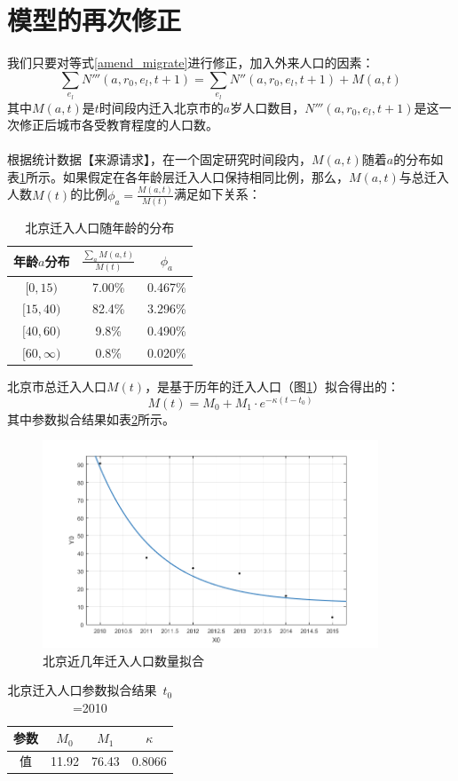 \documentclass[a4paper]{article}
\begin{document}
\section{模型的再次修正}
我们只要对等式\ref{amend_migrate}进行修正，加入外来人口的因素：
	\begin{equation}
		\label{beijing_amend_migrate}
		\sum_{e_l} N'''(a,r_0,e_l,t+1) = \sum_{e_l} N''(a,r_0,e_l,t+1) + M(a,t)
	\end{equation}
其中$M(a,t)$是$t$时间段内迁入北京市的$a$岁人口数目，$N'''(a,r_0,e_l,t+1)$是这一次修正后城市各受教育程度的人口数。\\\\
\indent
根据统计数据【来源请求】，在一个固定研究时间段内，$M(a,t)$随着$a$的分布如表\ref{beijing_migrate_rate}所示。如果假定在各年龄层迁入人口保持相同比例，那么，$M(a,t)$与总迁入人数$M(t)$的比例$\phi_a = \frac{M(a,t)}{M(t)}$满足如下关系：
	\begin{table}[H]
		\centering
		\caption{北京迁入人口随年龄的分布}
		\label{beijing_migrate_rate}
		\begin{tabular}{ccc}
			\hline
			年龄$a$分布	&	$\frac{\sum_a M(a,t)}{M(t)}$	&	$\phi_a$	\\
			\hline
			$[0,15)$			&	7.00\%	&	0.467\%	\\
			$[15,40)$		&	82.4\%	&	3.296\%	\\
			$[40,60)$		&	9.8\%		&	0.490\%	\\
			$[60,\infty)$	&	0.8\%		&	0.020\%	\\
			\hline
		\end{tabular}
	\end{table}
\indent
北京市总迁入人口$M(t)$，是基于历年的迁入人口（图\ref{beijing_1}）拟合得出的：
	\begin{equation}
		\label{beijing_migrate_all}
		M(t) = M_0 + M_1 \cdot e^{-\kappa (t-t_0)}
	\end{equation}
其中参数拟合结果如表\ref{beijing_migrate_para}所示。
	\begin{figure}[htbp]
		\centering
		\includegraphics[width=10cm]{pics/beijing_1.png}
		\caption{北京近几年迁入人口数量拟合} 
		\label{beijing_1}	
	\end{figure}
	\begin{table}[H]
		\centering
		\caption{北京迁入人口参数拟合结果\ $t_0$=2010}
		\label{beijing_migrate_para}
		\begin{tabular}{c|ccc}
			参数	&	$M_0$	&	$M_1$	&	$\kappa$	\\
			\hline
			值		&	11.92 		&	76.43		&	0.8066		\\
		\end{tabular}
	\end{table}
\end{document}
